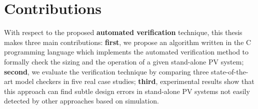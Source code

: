 \section{Contributions}

With respect to the proposed \textbf{automated verification} technique, this thesis makes three main contributions: \textbf{first}, we propose an algorithm written in the C programming language which implements the automated verification method to formally check the sizing and the operation of a given stand-alone PV system; \textbf{second}, we evaluate the verification technique by comparing three state-of-the-art model checkers in five real case studies; \textbf{third}, experimental results show that this approach can find subtle design errors in stand-alone PV systems not easily detected by other approaches based on simulation.

